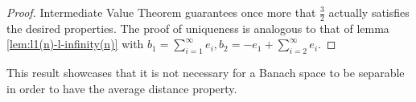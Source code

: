 \begin{proof}
		Intermediate Value Theorem guarantees once more that $\frac{3}{2}$ actually satisfies the desired properties. The proof of uniqueness is analogous to that of lemma \ref{lem:l1(n)-l-infinity(n)} with $b_1=\sum_{i=1}^\infty e_i, b_2=-e_1+\sum_{i=2}^\infty e_i$.
%	
%	
\end{proof}

This result showcases that it is not necessary for a Banach space to be separable in order to have the average distance property.

